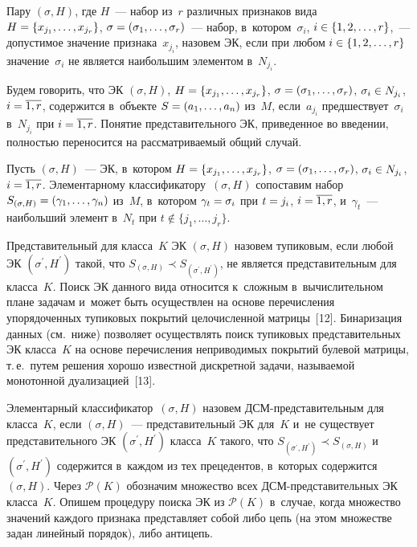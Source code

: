 \begin{multicols}{2}
  Пару $(\sigma, H)$, где $H$~--- набор из~$r$ различных признаков вида 
$H\hm= \{x_{j_1}, \ldots , x_{j_r}\}$, $\sigma\hm= (\sigma_1, \ldots ,  
\sigma_r)$~--- набор, в~котором~$\sigma_i$, $i\hm\in \{1,2,\ldots , r\}$,~--- 
допустимое значение признака~$x_{j_i}$, назовем 
ЭК, если при любом $i\hm\in \{1,2,\ldots , r\}$ 
значение~$\sigma_i$ не является наибольшим элементом в~$N_{j_i}$.
  
  Будем говорить, что ЭК $(\sigma, H)$, $H\hm= \{ x_{j_1}, \ldots , x_{j_r}\}$, 
$\sigma\hm= (\sigma_1, \ldots , \sigma_r)$, $\sigma_i\hm\in N_{j_i}$, 
$i\hm=\overline{1,r}$, содержится в~объекте $S\hm= (a_1, \ldots , a_n)$ из~$M$, 
если~$a_{j_i}$ предшествует~$\sigma_i$ в~$N_{j_i}$ при $i\hm=\overline{1, r}$. 
Понятие представительного ЭК, приведенное во введении, полностью 
переносится на рассматриваемый общий случай.
  
  Пусть $(\sigma, H)$~--- ЭК, в~котором $H\hm= \{ x_{j_1}, \ldots , x_{j_r}\}$, 
$\sigma\hm= (\sigma_1, \ldots , \sigma_r)$,  $\sigma_i\hm\in N_{j_i}$, 
$i\hm=\overline{1, r}$. Элементарному классификатору~$(\sigma, H)$ сопоставим набор $S_{(\sigma, H)} \hm= 
(\gamma_1, \ldots , \gamma_n)$ из~$M$, в~котором  $\gamma_t\hm=\sigma_i$ при 
$t\hm= j_i$, $i\hm=\overline{1, r}$, и~$\gamma_t$~--- наибольший элемент в~$N_t$ 
при $t\notin \{j_1,\ldots , j_r\}$. 
  
  Представительный для класса~$K$ ЭК $(\sigma, H)$ назовем тупиковым, если 
любой ЭК $(\sigma^\prime, H^\prime)$ такой, что $S_{(\sigma, H)}\prec 
S_{(\sigma^\prime, H^\prime)}$, не является представительным для класса~$K$. 
Поиск ЭК данного вида относится к~сложным в~вычислительном плане задачам 
и~может быть осуществлен на основе перечисления упорядоченных тупиковых 
покрытий целочисленной матрицы~[12]. Бинаризация данных (см.\ ниже) 
позволяет осуществлять поиск тупиковых представительных ЭК класса~$K$ на 
основе перечисления неприводимых покрытий булевой матрицы, т.\,е.\ путем 
решения хорошо известной дискретной задачи, называемой монотонной 
дуализацией~[13]. 
  
  Элементарный классификатор~$(\sigma, H)$ назовем ДСМ-пред\-ста\-ви\-тель\-ным для класса~$K$, 
если $(\sigma, H)$~--- представительный ЭК для~$K$ и~не существует 
представительного ЭК $(\sigma^\prime, H^\prime)$ класса~$K$ такого, что 
$S_{(\sigma^\prime, H^\prime)} \prec S_{(\sigma, H)}$ и~$(\sigma^\prime, 
H^\prime)$ содержится в~каждом из тех прецедентов, в~которых содержится 
$(\sigma, H)$. Через $\mathcal{P}(K)$ обозначим множество всех  
ДСМ-пред\-ста\-ви\-тель\-ных ЭК класса~$K$. Опишем процедуру поиска ЭК из 
$\mathcal{P}(K)$ в~случае, когда множество значений каждого признака 
представляет собой либо цепь (на этом множестве задан линейный порядок), 
либо антицепь. 
  

\end{multicols}
